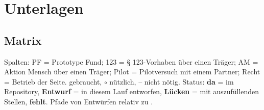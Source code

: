 \documentclass[10pt,parskip=half-]{scrartcl}
\newcommand{\ja}{\textbullet}
\newcommand{\nuetzlich}{$\circ$}
\newcommand{\nein}{--}
\begin{document}
\section{Unterlagen}

\subsection{Matrix}
Spalten: PF = Prototype Fund; 123 = § 123-Vorhaben über einen Träger; AM = Aktion Mensch über
einen Träger; Pilot = Pilotversuch mit einem Partner; Recht = Betrieb der Seite.
\ja{} gebraucht, \nuetzlich{} nützlich, \nein{} nicht nötig. Status: \textbf{da} = im Repository,
\textbf{Entwurf} = in diesem Lauf entworfen, \textbf{Lücken} = mit auszufüllenden Stellen,
\textbf{fehlt}. Pfade von Entwürfen relativ zu .
\end{document}
